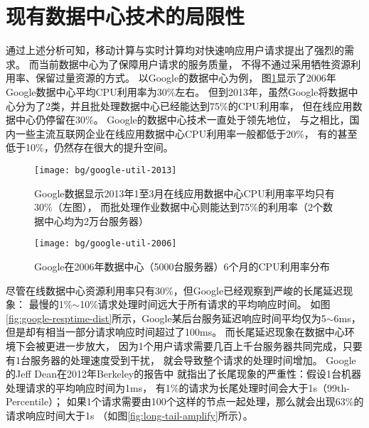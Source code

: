 \section{现有数据中心技术的局限性}

通过上述分析可知，移动计算与实时计算均对快速响应用户请求提出了强烈的需求。
而当前数据中心为了保障用户请求的服务质量，
不得不通过采用牺牲资源利用率、保留过量资源的方式。
以Google的数据中心为例，
图\ref{fig:google-util-2006}显示了2006年Google数据中心平均CPU利用率为30\%左右。
但到2013年，虽然Google将数据中心分为了2类，并且批处理数据中心已经能达到75\%的CPU利用率，
但在线应用数据中心仍停留在30\%。
Google的数据中心技术一直处于领先地位，
与之相比，国内一些主流互联网企业在线应用数据中心CPU利用率一般都低于20\%，
有的甚至低于10\%，仍然存在很大的提升空间。

\begin{figure}
\begin{minipage}{0.57\textwidth}
  \centering
  \texttt{[image: bg/google-util-2013]}
  \caption[Google数据中心CPU利用率分布（2013年）]
    {Google数据显示2013年1至3月在线应用数据中心CPU利用率平均只有30\%（左图），
     而批处理作业数据中心则能达到75\%的利用率（2个数据中心均为2万台服务器）\cite{barroso_datacenter_2013}}
  \label{fig:google-util-2013}
\end{minipage}\hfill
\begin{minipage}{0.39\textwidth}
  \centering
  \texttt{[image: bg/google-util-2006]}
  \caption[Google数据中心CPU利用率分布（2006年）]
    {Google在2006年数据中心（5000台服务器）6个月的CPU利用率分布\cite{barroso_datacenter_2009}}
  \label{fig:google-util-2006}
\end{minipage}
\end{figure}

尽管在线数据中心资源利用率只有30\%，但Google已经观察到严峻的长尾延迟现象：
最慢的1\%$\sim$10\%请求处理时间远大于所有请求的平均响应时间。
如图\ref{fig:google-resptime-dist}所示，Google某后台服务延迟响应时间平均仅为5$\sim$6ms，
但是却有相当一部分请求响应时间超过了100ms\cite{Krushevskaja:2013}。
而长尾延迟现象在数据中心环境下会被更进一步放大，
因为1个用户请求需要几百上千台服务器共同完成，只要有1台服务器的处理速度受到干扰，
就会导致整个请求的处理时间增加。
Google的Jeff Dean在2012年Berkeley的报告\cite{dean_achieving_2012}中
就指出了长尾现象的严重性：假设1台机器处理请求的平均响应时间为1ms，
有1\%的请求为长尾处理时间会大于1s（99th-Percentile）；
如果1个请求需要由100个这样的节点一起处理，那么就会出现63\%的请求响应时间大于1s
（如图\ref{fig:long-tail-amplify}所示）。

